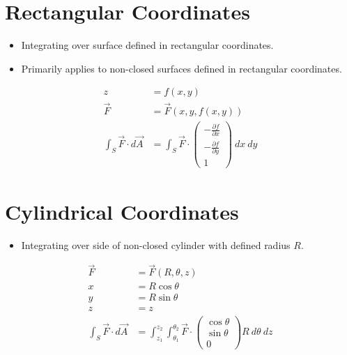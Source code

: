 \documentclass[12pt]{extarticle}
\title{}
\author{}
\date{}
\begin{document}
\renewcommand{\arraystretch}{1.5}
  \section{Rectangular Coordinates}%
  \begin{itemize}
    \item Integrating over surface defined in rectangular coordinates.
    \item Primarily applies to non-closed surfaces defined in rectangular coordinates.
  \end{itemize}
  \begin{align*}
    z &= f(x,y)\\
    \vec{F} &= \vec{F}(x,y,f(x,y))\\
    \int_{S} \vec{F} \cdot d\vec{A} &= \int_{S} \vec{F} \cdot \begin{pmatrix}-\frac{\partial f}{\partial x}\\
  -\frac{\partial f}{\partial y}\\1\end{pmatrix}~dx~dy
  \end{align*}
  \section{Cylindrical Coordinates}%
  \begin{itemize}
    \item Integrating over side of non-closed cylinder with defined radius $R$.
  \end{itemize}
  \begin{align*}
    \vec{F} &= \vec{F}(R,\theta,z)\\
    x &= R\cos\theta\\
    y &= R\sin\theta\\
    z &= z\\
    \int_{S} \vec{F}\cdot d\vec{A} &= \int_{z_1}^{z_2}\int_{\theta_1}^{\theta_2}\vec{F} \cdot \begin{pmatrix}\cos\theta\\\sin\theta\\0\end{pmatrix}R~d\theta~dz
  \end{align*}
\end{document}
